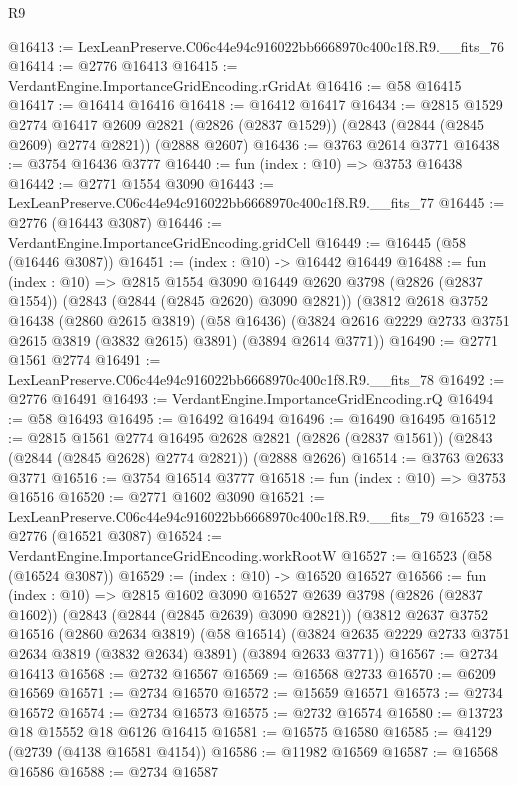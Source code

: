 \begin{lexlean}{R9}
\begin{coremodule}
@16413 := LexLeanPreserve.C06c44e94c916022bb6668970c400c1f8.R9.__fits_76
@16414 := @2776 @16413
@16415 := VerdantEngine.ImportanceGridEncoding.rGridAt
@16416 := @58 @16415
@16417 := @16414 @16416
@16418 := @16412 @16417
@16434 := @2815
    @1529
    @2774
    @16417
    @2609
    @2821
    (@2826 (@2837 @1529))
    (@2843 (@2844 (@2845 @2609) @2774 @2821))
    (@2888 @2607)
@16436 := @3763 @2614 @3771
@16438 := @3754 @16436 @3777
@16440 := fun (index : @10) => @3753 @16438
@16442 := @2771 @1554 @3090
@16443 := LexLeanPreserve.C06c44e94c916022bb6668970c400c1f8.R9.__fits_77
@16445 := @2776 (@16443 @3087)
@16446 := VerdantEngine.ImportanceGridEncoding.gridCell
@16449 := @16445 (@58 (@16446 @3087))
@16451 := (index : @10) -> @16442 @16449
@16488 := fun (index : @10) =>
  @2815
    @1554
    @3090
    @16449
    @2620
    @3798
    (@2826 (@2837 @1554))
    (@2843 (@2844 (@2845 @2620) @3090 @2821))
    (@3812
      @2618
      @3752
      @16438
      (@2860 @2615 @3819)
      (@58 @16436)
      (@3824 @2616 @2229 @2733 @3751 @2615 @3819 (@3832 @2615) @3891)
      (@3894 @2614 @3771))
@16490 := @2771 @1561 @2774
@16491 := LexLeanPreserve.C06c44e94c916022bb6668970c400c1f8.R9.__fits_78
@16492 := @2776 @16491
@16493 := VerdantEngine.ImportanceGridEncoding.rQ
@16494 := @58 @16493
@16495 := @16492 @16494
@16496 := @16490 @16495
@16512 := @2815
    @1561
    @2774
    @16495
    @2628
    @2821
    (@2826 (@2837 @1561))
    (@2843 (@2844 (@2845 @2628) @2774 @2821))
    (@2888 @2626)
@16514 := @3763 @2633 @3771
@16516 := @3754 @16514 @3777
@16518 := fun (index : @10) => @3753 @16516
@16520 := @2771 @1602 @3090
@16521 := LexLeanPreserve.C06c44e94c916022bb6668970c400c1f8.R9.__fits_79
@16523 := @2776 (@16521 @3087)
@16524 := VerdantEngine.ImportanceGridEncoding.workRootW
@16527 := @16523 (@58 (@16524 @3087))
@16529 := (index : @10) -> @16520 @16527
@16566 := fun (index : @10) =>
  @2815
    @1602
    @3090
    @16527
    @2639
    @3798
    (@2826 (@2837 @1602))
    (@2843 (@2844 (@2845 @2639) @3090 @2821))
    (@3812
      @2637
      @3752
      @16516
      (@2860 @2634 @3819)
      (@58 @16514)
      (@3824 @2635 @2229 @2733 @3751 @2634 @3819 (@3832 @2634) @3891)
      (@3894 @2633 @3771))
@16567 := @2734 @16413
@16568 := @2732 @16567
@16569 := @16568 @2733
@16570 := @6209 @16569
@16571 := @2734 @16570
@16572 := @15659 @16571
@16573 := @2734 @16572
@16574 := @2734 @16573
@16575 := @2732 @16574
@16580 := @13723 @18 @15552 @18 @6126 @16415
@16581 := @16575 @16580
@16585 := @4129 (@2739 (@4138 @16581 @4154))
@16586 := @11982 @16569
@16587 := @16568 @16586
@16588 := @2734 @16587

\end{coremodule}
\end{lexlean}
